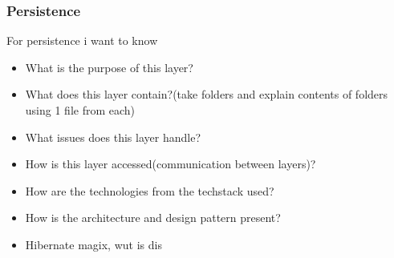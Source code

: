 \subsubsection{Persistence}
For persistence i want to know
\begin{itemize}
    \item What is the purpose of this layer?
    \item What does this layer contain?(take folders and explain contents of folders using 1 file from each)
    \item What issues does this layer handle?
    \item How is this layer accessed(communication between layers)?
    \item How are the technologies from the techstack used?
    \item How is the architecture and design pattern present?
    \item Hibernate magix, wut is dis
\end{itemize}
